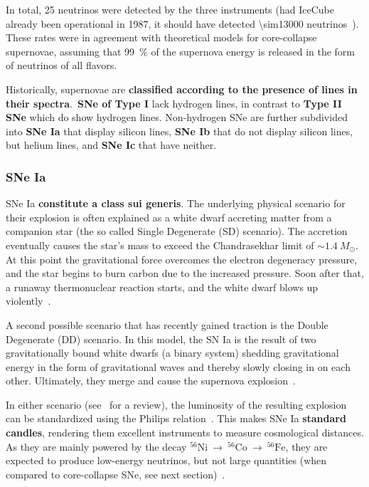 In total, 25 neutrinos were detected by the three instruments (had IceCube already been operational in 1987, it should have detected \num{\sim13000} neutrinos~). These rates were in agreement with theoretical models for core-collapse supernovae, assuming that \SI{99}{\percent} of the supernova energy is released in the form of neutrinos of all flavors.

Historically, supernovae are \textbf{classified according to the presence of lines in their spectra}.\ \textbf{SNe of Type I} lack hydrogen lines, in contrast to \textbf{Type II SNe} which do show hydrogen lines. Non-hydrogen SNe are further subdivided into \textbf{SNe Ia} that display silicon lines, \textbf{SNe Ib} that do not display silicon lines, but helium lines, and \textbf{SNe Ic} that have neither.

\subsubsection{SNe Ia}\label{sne_ia}
SNe Ia \textbf{constitute a class sui generis}. The underlying physical scenario for their explosion is often explained as a white dwarf accreting matter from a companion star (the so called Single Degenerate (SD) scenario). The accretion eventually causes the star's mass to exceed the Chandrasekhar limit of $\sim1.4~M_\odot$. At this point the gravitational force overcomes the electron degeneracy pressure, and the star begins to burn carbon due to the increased pressure. Soon after that, a runaway thermonuclear reaction starts, and the white dwarf blows up violently~.

A second possible scenario that has recently gained traction is the Double Degenerate (DD) scenario. In this model, the SN Ia is the result of two gravitationally bound white dwarfs (a binary system) shedding gravitational energy in the form of gravitational waves and thereby slowly closing in on each other. Ultimately, they merge and cause the supernova explosion~\cite{Iben1984}.

In either scenario (see~ for a review), the luminosity of the resulting explosion can be standardized using the Philips relation~. This makes SNe Ia \textbf{standard candles}, rendering them excellent instruments to measure cosmological distances. As they are mainly powered by the decay $^{56}\text{Ni}~\rightarrow~^{56}\text{Co}~\rightarrow~^{56}\text{Fe}$, they are expected to produce low-energy neutrinos, but not large quantities (when compared to core-collapse SNe, see next section)~.


